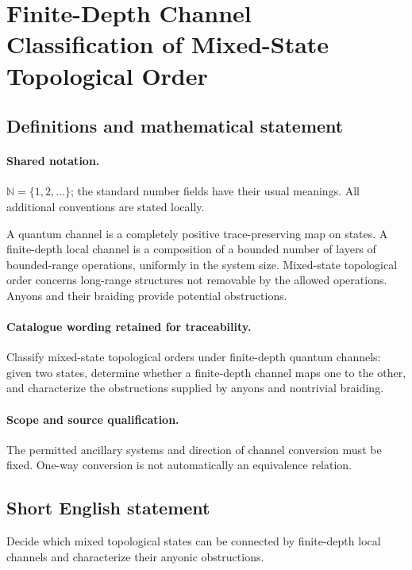 \documentclass[11pt]{article}
\begin{document}
\section{Finite-Depth Channel Classification of Mixed-State Topological Order}\label{statement}

\subsection{Definitions and mathematical statement}

\paragraph{Shared notation.}$\mathbb N=\{1,2,\ldots\}$; the standard number fields have their usual meanings. All additional conventions are stated locally.


A quantum channel is a completely positive trace-preserving map on states. A finite-depth local channel is a composition of a bounded number of layers of bounded-range operations, uniformly in the system size. Mixed-state topological order concerns long-range structures not removable by the allowed operations. Anyons and their braiding provide potential obstructions.

\paragraph{Catalogue wording retained for traceability.}
Classify mixed-state topological orders under finite-depth quantum channels: given two states, determine whether a finite-depth channel maps one to the other, and characterize the obstructions supplied by anyons and nontrivial braiding.

\paragraph{Scope and source qualification.}The permitted ancillary systems and direction of channel conversion must be fixed. One-way conversion is not automatically an equivalence relation.
\subsection{Short English statement}
Decide which mixed topological states can be connected by finite-depth local channels and characterize their anyonic obstructions.
\end{document}

